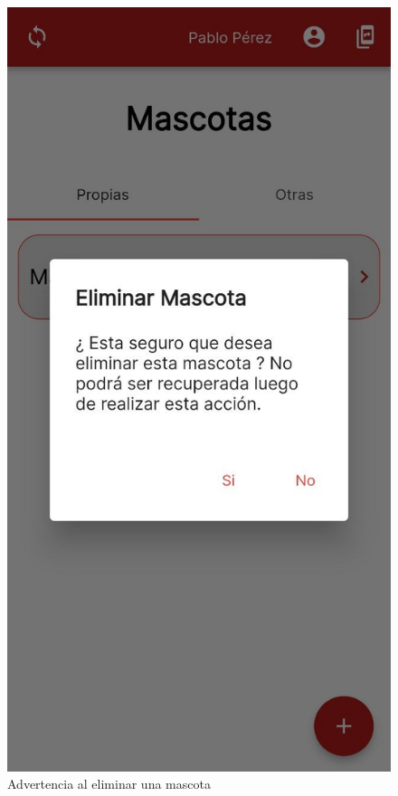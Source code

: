 \begin{figure}[h!]
\begin{center}
\includegraphics[scale=0.19]{Graphics/images/hcvet/delete.jpg}
\caption{ Advertencia al eliminar una mascota}
\label{fig:bac}

\end{center}
\end{figure}

